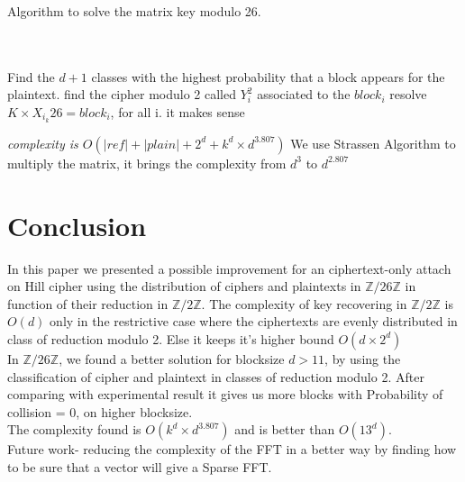 \documentclass{article}
\begin{document}
Algorithm to solve the matrix key modulo 26.\\
\\
\begin{algorithmic}[1]
\\
\STATE Find the $d+1$ classes with the highest probability that a block appears for the plaintext.
	\STATE find the cipher modulo 2 called $Y_{i}^2$ associated to the $block_{i}$
\ENDFOR
	\REPEAT
	\STATE resolve $ K \times X_{i_{k}}{26} =block_{i}$, for all i.
	\UNTIL it makes sense
\end{algorithmic}
\textit{complexity is $O(|ref| + |plain| + 2^{d} + k^d \times d^{3.807})$}
We use Strassen Algorithm to multiply the matrix, it brings the complexity from $d^3$ to $d^{2.807}$

\newpage
\section*{Conclusion}
In this paper we presented a possible improvement for an ciphertext-only attach on Hill cipher using the distribution of ciphers and plaintexts in $\mathbb{Z}/26\mathbb{Z}$ in function of their reduction in $\mathbb{Z}/2\mathbb{Z}$.
The complexity of key recovering in $\mathbb{Z}/2\mathbb{Z}$ is $O(d)$ only in the restrictive case where the ciphertexts are evenly distributed in class of reduction modulo 2. Else it keeps it's higher bound $O(d\times 2^d)$\\
In $\mathbb{Z}/26\mathbb{Z}$, we found a better solution for blocksize $d>11$, by using the classification of cipher and plaintext in classes of reduction modulo 2. After comparing with experimental result it gives us more blocks with Probability of collision = 0, on higher blocksize.\\
The complexity found is $O(k^d \times d^{3.807})$ and is better than $O(13^d)$.\\
Future work- reducing the complexity of the FFT in a better way by finding how to be sure that a vector will give a Sparse FFT.

\newpage
\end{document}
